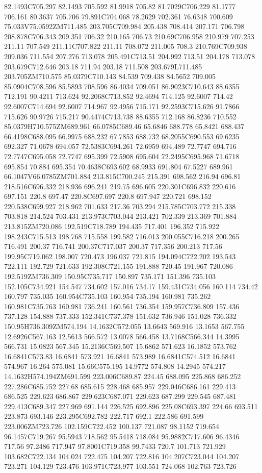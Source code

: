 82.1493C705.297 82.1493 705.592 81.9918 705.82 81.7029C706.229 81.1777 706.161 80.3637 705.706 79.891C704.068 78.2629 702.361 76.6348 700.609 75.033V75.0592ZM711.485 203.705C709.984 205.438 708.414 207.171 706.798 208.878C706.343 209.351 706.32 210.165 706.73 210.69C706.958 210.979 707.253 211.11 707.549 211.11C707.822 211.11 708.072 211.005 708.3 210.769C709.938 209.036 711.554 207.276 713.078 205.491C713.51 204.992 713.51 204.178 713.078 203.679C712.646 203.18 711.94 203.18 711.508 203.679L711.485 203.705ZM710.575 85.0379C710.143 84.539 709.438 84.5652 709.005 85.0904C708.596 85.5893 708.596 86.4034 709.051 86.9023C710.643 88.6355 712.191 90.4211 713.624 92.2068C713.852 92.4694 714.125 92.6007 714.42 92.6007C714.694 92.6007 714.967 92.4956 715.171 92.2593C715.626 91.7866 715.626 90.9726 715.217 90.4474C713.738 88.6355 712.168 86.8236 710.552 85.0379H710.575ZM689.961 66.0785C689.46 65.6846 688.778 65.8421 688.437 66.4198C688.095 66.9975 688.232 67.7853 688.732 68.2055C690.553 69.6235 692.327 71.0678 694.057 72.5383C694.261 72.6959 694.489 72.7747 694.716 72.7747C695.058 72.7747 695.399 72.5908 695.604 72.2495C695.968 71.6718 695.854 70.884 695.354 70.4638C693.602 68.9933 691.804 67.5227 689.961 66.1047V66.0785ZM701.884 213.815C700.245 215.391 698.562 216.94 696.81 218.516C696.332 218.936 696.241 219.75 696.605 220.301C696.832 220.616 697.151 220.8 697.47 220.8C697.697 220.8 697.947 220.721 698.152 220.538C699.927 218.962 701.633 217.36 703.294 215.785C703.772 215.338 703.818 214.524 703.431 213.973C703.044 213.421 702.339 213.369 701.884 213.815ZM720.086 192.519C718.789 194.435 717.401 196.352 715.922 198.243C715.513 198.768 715.558 199.582 716.013 200.055C716.218 200.265 716.491 200.37 716.741 200.37C717.037 200.37 717.356 200.213 717.56 199.95C719.062 198.007 720.473 196.037 721.815 194.094C722.202 193.543 722.111 192.729 721.633 192.308C721.155 191.888 720.45 191.967 720.086 192.519ZM736.309 150.95C735.717 150.897 735.171 151.396 735.103 152.105C734.921 154.547 734.602 157.016 734.17 159.431C734.056 160.114 734.42 160.797 735.035 160.954C735.103 160.954 735.194 160.981 735.262 160.981C735.763 160.981 736.241 160.561 736.354 159.957C736.809 157.436 737.128 154.888 737.333 152.341C737.378 151.632 736.946 151.028 736.332 150.95H736.309ZM574.194 14.1632C572.055 13.6643 569.916 13.1653 567.755 12.6926C567.163 12.5613 566.572 13.0078 566.458 13.7168C566.344 14.3995 566.731 15.0823 567.345 15.2136C569.507 15.6862 571.623 16.1852 573.762 16.6841C573.83 16.6841 573.921 16.6841 573.989 16.6841C574.512 16.6841 574.967 16.264 575.081 15.66C575.195 14.9772 574.808 14.2945 574.217 14.1632H574.194ZM691.599 223.006C689.87 224.45 688.095 225.868 686.252 227.286C685.752 227.68 685.615 228.468 685.957 229.046C686.161 229.413 686.525 229.623 686.867 229.623C687.071 229.623 687.299 229.545 687.481 229.413C689.347 227.969 691.144 226.525 692.896 225.08C693.397 224.66 693.511 223.873 693.146 223.295C692.782 222.717 692.1 222.586 691.599 223.006ZM723.726 102.159C722.452 100.137 721.087 98.1152 719.654 96.1457C719.267 95.5943 718.562 95.5418 718.084 95.9882C717.606 96.4346 717.56 97.2486 717.947 97.8001C719.358 99.7433 720.7 101.713 721.929 103.682C722.134 104.024 722.475 104.207 722.816 104.207C723.044 104.207 723.271 104.129 723.476 103.971C723.977 103.551 724.068 102.763 723.726 